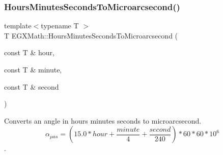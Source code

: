 \mbox{\label{group___e_g_x_math-_angle_conversions-_hours_minutes_seconds_ga061e4fa10d73e459d5f411cfe436bbe3}} 
\subsubsection{\texorpdfstring{Hours\+Minutes\+Seconds\+To\+Microarcsecond()}{HoursMinutesSecondsToMicroarcsecond()}}
{\footnotesize\ttfamily template$<$typename T $>$ \\
T E\+G\+X\+Math\+::\+Hours\+Minutes\+Seconds\+To\+Microarcsecond (\begin{DoxyParamCaption}\item[{const T \&}]{hour,  }\item[{const T \&}]{minute,  }\item[{const T \&}]{second }\end{DoxyParamCaption})}



Converts an angle in hours minutes seconds to microarcsecond. \[\alpha_{\mu as}=(15.0 * hour + \frac{minute}{4} + \frac{second}{240}) * 60 * 60 * 10^6\]. 


